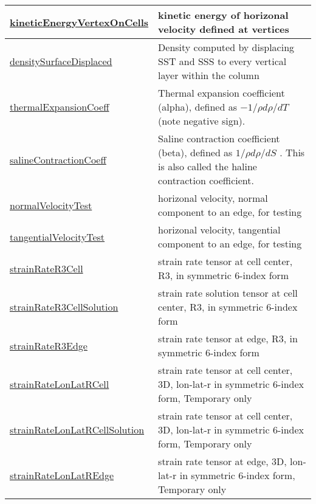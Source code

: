 {\begin{center}
\begin{longtable}{| p{2.0in} | p{4.0in} |}
    \hline
    \hyperref[subsec:var_sec_scratch_kineticEnergyVertexOnCells]{kineticEnergyVertexOnCells} & kinetic energy of horizonal velocity defined at vertices \\
    \hline
    \hyperref[subsec:var_sec_scratch_densitySurfaceDisplaced]{densitySurfaceDisplaced} & Density computed by displacing SST and SSS to every vertical layer within the column \\
    \hline
    \hyperref[subsec:var_sec_scratch_thermalExpansionCoeff]{thermalExpansionCoeff} &  Thermal expansion coefficient (alpha), defined as  $-1/\rho d\rho/dT$  (note negative sign). \\
    \hline
    \hyperref[subsec:var_sec_scratch_salineContractionCoeff]{salineContractionCoeff} &  Saline contraction coefficient (beta), defined as  $1/\rho d\rho/dS$ . This is also called the haline contraction coefficient. \\
    \hline
    \hyperref[subsec:var_sec_scratch_normalVelocityTest]{normalVelocityTest} & horizonal velocity, normal component to an edge, for testing \\
    \hline
    \hyperref[subsec:var_sec_scratch_tangentialVelocityTest]{tangentialVelocityTest} & horizonal velocity, tangential component to an edge, for testing \\
    \hline
    \hyperref[subsec:var_sec_scratch_strainRateR3Cell]{strainRateR3Cell} & strain rate tensor at cell center, R3, in symmetric 6-index form \\
    \hline
    \hyperref[subsec:var_sec_scratch_strainRateR3CellSolution]{strainRateR3CellSolution} & strain rate solution tensor at cell center, R3, in symmetric 6-index form \\
    \hline
    \hyperref[subsec:var_sec_scratch_strainRateR3Edge]{strainRateR3Edge} & strain rate tensor at edge, R3, in symmetric 6-index form \\
    \hline
    \hyperref[subsec:var_sec_scratch_strainRateLonLatRCell]{strainRateLonLatRCell} & strain rate tensor at cell center, 3D, lon-lat-r in symmetric 6-index form, {\color{red}Temporary only} \\
    \hline
    \hyperref[subsec:var_sec_scratch_strainRateLonLatRCellSolution]{strainRateLonLatRCellSolution} & strain rate tensor at cell center, 3D, lon-lat-r in symmetric 6-index form, {\color{red}Temporary only} \\
    \hline
    \hyperref[subsec:var_sec_scratch_strainRateLonLatREdge]{strainRateLonLatREdge} & strain rate tensor at edge, 3D, lon-lat-r in symmetric 6-index form, {\color{red}Temporary only} \\

\end{longtable}
\end{center}}
